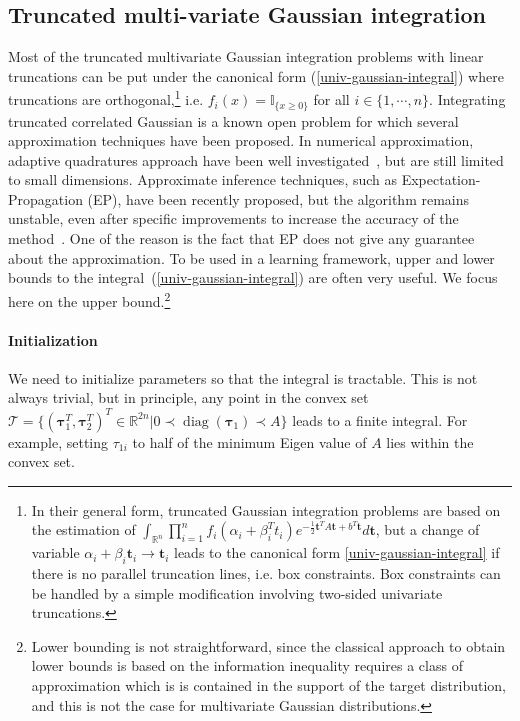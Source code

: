 \documentclass{article} %
\renewcommand{\t}{\mathbf{t}}
\newcommand{\diag}[1]{\mathop{\textrm{diag}}\left(#1\right)}
\newcommand{\tauspace}{\mathcal{T}}
\newcommand{\transp}{^{T}}
\def\Indic#1{\mathbb{I}_{\{#1\}}}
\def\A{A}
\def\btau{{\bm{\tau}}}
\renewcommand{\Re}{\mathbb{R}}
\begin{document}
\subsection{Truncated multi-variate Gaussian integration}
Most of the truncated multivariate Gaussian integration problems with linear
truncations can be put under the canonical form (\ref{univ-gaussian-integral})
where truncations are orthogonal,\footnote{ In their general form, truncated Gaussian integration problems
are based on the estimation of $\int_{\Re^n}  \prod_{i=1}^n f_i(\alpha_i +
\beta_i\transp t_i) e^{-\frac 12 \t\transp \A \t + b\transp \t} d\t$, but a
change of variable $\alpha_i + \beta_i\t_i \rightarrow \t_i$ leads to the
canonical form \eqref{univ-gaussian-integral} if there is no parallel truncation
lines, i.e. box constraints. Box constraints can be handled by a simple
modification involving two-sided univariate truncations. 
}
 i.e.
 $f_i(x)=\Indic{x\ge 0}$ for all $i\in\{1,\cdots,n\}$.
Integrating truncated correlated Gaussian is a known open problem for which
several approximation techniques have been proposed.
In numerical approximation,
adaptive quadratures approach have been well
investigated~\citep{genz2009computation}, but are still limited to small
dimensions. Approximate inference techniques,
such as Expectation-Propagation (EP), have been recently proposed, but the algorithm
remains unstable, even after specific improvements to increase the accuracy of
the method~\citep{Cunningham-et-al-Gaussian-EP2012}.
One of the reason is the fact that EP does not give any guarantee about the
approximation. To be used in a learning framework, upper and lower
bounds to the integral~(\ref{univ-gaussian-integral}) are often very useful. 
We focus here on the upper bound.\footnote{Lower bounding is not straightforward, since the
classical approach to obtain lower bounds is based on the information inequality
requires a class of approximation which is is contained in the support of the
target distribution, and this is not the case for multivariate Gaussian
distributions.} 
%
\paragraph{Initialization}
We need to initialize parameters so that the integral is tractable. This is not always trivial, but in principle, 
any point in the convex set $\tauspace=\{(\btau_1\transp, \btau_2\transp)\transp \in\Re^{2n} | 0\prec\diag{\btau_1}\prec A \}$ leads to a finite integral. For example, setting $\tau_{1i}$ to half of the minimum Eigen value of $A$ lies within the convex set.
\end{document}

